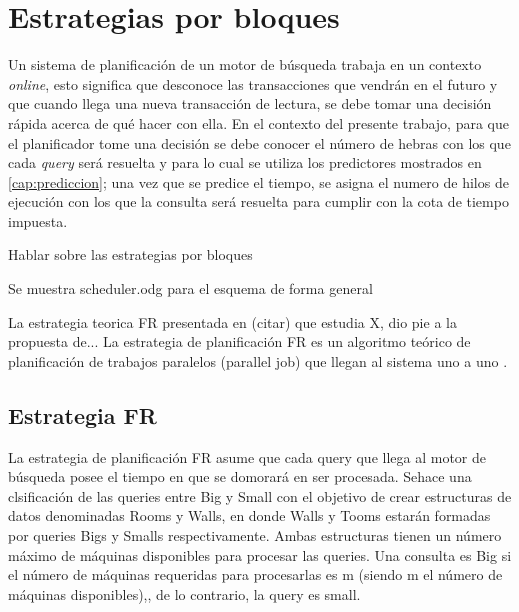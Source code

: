 \section{Estrategias por bloques}
\label{scheduling:bloques}
Un sistema de planificación de un motor de búsqueda trabaja en un contexto \textit{online}, esto significa que desconoce las transacciones que vendrán en el futuro y que cuando llega una nueva transacción de lectura, se debe tomar una decisión rápida acerca de qué hacer con ella. En el contexto del presente trabajo, para que el planificador tome una decisión se debe conocer el número de hebras con los que cada \textit{query} será resuelta y para lo cual se utiliza los predictores mostrados en \ref{cap:prediccion}; una vez que se predice el tiempo, se asigna el numero de hilos de ejecución con los que la consulta será resuelta para cumplir con la cota de tiempo impuesta.



Hablar sobre las estrategias por bloques

Se muestra scheduler.odg para el esquema de forma general

La estrategia teorica FR presentada en (citar) que estudia X, dio pie a la propuesta de... 
La estrategia de planificación FR es un algoritmo teórico de planificación de trabajos paralelos (parallel job) que llegan al sistema uno a uno \citep{Ye:2007}.




\subsection{Estrategia FR}
\label{scheduling:fr}
La estrategia de planificación FR asume que cada query que llega al motor de búsqueda posee el tiempo en que se domorará en ser procesada. 
Sehace una clsificación de las queries entre Big y Small con el objetivo de crear estructuras de datos denominadas Rooms y Walls, en donde Walls y Tooms estarán formadas por queries Bigs y Smalls respectivamente. Ambas estructuras tienen un número máximo de máquinas disponibles para procesar las queries. Una consulta es Big si el número de máquinas requeridas para procesarlas es m (siendo m el número de máquinas disponibles),, de lo contrario, la query es small. 

